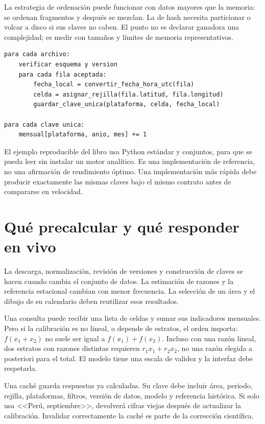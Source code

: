 La estrategia de ordenación puede funcionar con datos mayores que la memoria: se
ordenan fragmentos y después se mezclan. La de hash necesita particionar o volcar a
disco si sus claves no caben. El punto no es declarar ganadora una complejidad; es
medir con tamaños y límites de memoria representativos.

\begin{lstlisting}[caption={Pseudocódigo: presencia diaria por plataforma.}]
para cada archivo:
    verificar esquema y version
    para cada fila aceptada:
        fecha_local = convertir_fecha_hora_utc(fila)
        celda = asignar_rejilla(fila.latitud, fila.longitud)
        guardar_clave_unica(plataforma, celda, fecha_local)

para cada clave unica:
    mensual[plataforma, anio, mes] += 1
\end{lstlisting}

El ejemplo reproducible del libro usa Python estándar y conjuntos, para que se pueda
leer sin instalar un motor analítico. Es una implementación de referencia, no una
afirmación de rendimiento óptimo. Una implementación más rápida debe producir
exactamente las mismas claves bajo el mismo contrato antes de compararse en velocidad.

\FloatBarrier
\section{Qué precalcular y qué responder en vivo}

La descarga, normalización, revisión de versiones y construcción de claves se hacen
cuando cambia el conjunto de datos. La estimación de razones y la referencia estacional
cambian con menor frecuencia. La selección de un área y el dibujo de su calendario
deben reutilizar esos resultados.

Una consulta puede recibir una lista de celdas y sumar sus indicadores mensuales.
Pero si la calibración es no lineal, o depende de estratos, el orden importa:
$f(x_1+x_2)$ no suele ser igual a $f(x_1)+f(x_2)$. Incluso con una razón lineal, dos
estratos con razones distintas requieren $r_1x_1+r_2x_2$, no una razón elegida a posteriori
para el total. El modelo tiene una escala de validez y la interfaz debe respetarla.

Una caché guarda respuestas ya calculadas. Su clave debe incluir área, periodo, rejilla,
plataformas, filtros, versión de datos, modelo y referencia histórica. Si solo usa
<<Perú, septiembre>>, devolverá cifras viejas después de actualizar la calibración.
Invalidar correctamente la caché es parte de la corrección científica.

